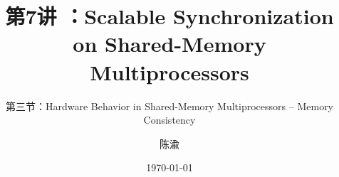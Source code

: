 


\title[第7讲]{第7讲 ：Scalable Synchronization on Shared-Memory Multiprocessors} %
\subtitle{第三节：Hardware Behavior in Shared-Memory Multiprocessors -- Memory Consistency}
\author{陈渝} %
\date{\today} %




\begin{frame}
\titlepage %
\end{frame}

